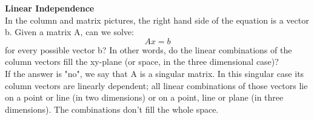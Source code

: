 \documentclass{ximera}
\begin{document}
\noindent
\textbf{Linear Independence} \\

\noindent
In the column and matrix pictures, the right hand side of the equation is a vector b. Given a matrix A, can we solve:
\[Ax = b\]
\noindent
for every possible vector b? In other words, do the linear combinations of the column vectors fill the xy-plane (or space, in the three dimensional case)? \\

\noindent
If the answer is "no", we say that A is a singular matrix. In this singular case its column vectors are linearly dependent; all linear combinations of those vectors lie on a point or line (in two dimensions) or on a point, line or plane (in three dimensions). The combinations don't fill the whole space.
\end{document}
